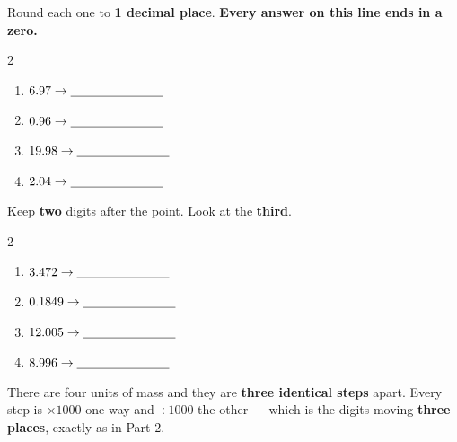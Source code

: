 \documentclass[12pt,a4paper]{article}
\begin{document}
\vspace{2pt}
\noindent Round each one to \textbf{1 decimal place}. \textbf{Every answer on this
line ends in a zero.}

\vspace{4pt}
\begin{multicols}{2}
\begin{enumerate}[label=(\alph*), itemsep=12pt]
  \item $6.97 \rightarrow \blank[2.6cm]$
  \item $0.96 \rightarrow \blank[2.6cm]$
  \item $19.98 \rightarrow \blank[2.6cm]$
  \item $2.04 \rightarrow \blank[2.6cm]$
\end{enumerate}
\end{multicols}


\noindent Keep \textbf{two} digits after the point. Look at the \textbf{third}.

\vspace{4pt}
\begin{multicols}{2}
\begin{enumerate}[label=(\alph*), itemsep=12pt]
  \item $3.472 \rightarrow \blank[2.6cm]$
  \item $0.1849 \rightarrow \blank[2.6cm]$
  \item $12.005 \rightarrow \blank[2.6cm]$
  \item $8.996 \rightarrow \blank[2.6cm]$
\end{enumerate}
\end{multicols}


\noindent There are four units of mass and they are \textbf{three identical steps}
apart. Every step is $\times 1000$ one way and $\div 1000$ the other --- which is the
digits moving \textbf{three places}, exactly as in Part 2.
\end{document}
